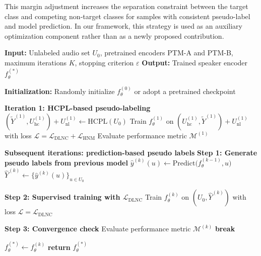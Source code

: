 \documentclass[lettersize,journal]{IEEEtran}
\begin{document}
This margin adjustment increases the separation constraint between
the target class and competing non-target classes for samples with
consistent pseudo-label and model prediction. In our framework, this
strategy is used as an auxiliary optimization component rather than
as a newly proposed contribution.

\begin{algorithm}[t]
\caption{Iterative Unsupervised Speaker Verification Training with HCPL Initialization}
\label{alg:alg2}
\begin{algorithmic}
\STATE 
\STATE \textbf{Input:} Unlabeled audio set $U_{0}$, pretrained encoders PTM-A and PTM-B, maximum iterations $K$, stopping criterion $\varepsilon$
\STATE \textbf{Output:} Trained speaker encoder $f_{\theta}^{(*)}$

\STATE 
\STATE \textbf{Initialization:} Randomly initialize $f_{\theta}^{(0)}$ or adopt a pretrained checkpoint

\STATE 
\STATE \textbf{Iteration 1: HCPL-based pseudo-labeling}
\STATE $(\tilde{Y}^{(1)}, U_{\mathrm{hc}}^{(1)})+U_{\mathrm{nl}}^{(1)} \gets \mathrm{HCPL}(U_{0})$ \hfill {}
\STATE Train $f_{\theta}^{(1)}$ on $(U_{\mathrm{hc}}^{(1)}, \tilde{Y}^{(1)}) + U_{\mathrm{nl}}^{(1)}$ with loss
\STATE \hspace{0.8cm} $\mathcal{L} = \mathcal{L}_{\mathrm{DLNC}} + \mathcal{L}_{\mathrm{HNM}}$
\STATE Evaluate performance metric $\mathcal{M}^{(1)}$

\STATE 
\STATE \textbf{Subsequent iterations: prediction-based pseudo labels}
    \STATE \textbf{Step 1: Generate pseudo labels from previous model}
        \STATE $\hat{y}^{(k)}(u) \gets \mathrm{Predict}\big(f_{\theta}^{(k-1)}, u\big)$
    \ENDFOR
    \STATE $\hat{Y}^{(k)} \gets \{\hat{y}^{(k)}(u)\}_{u \in U_{0}}$
    
    \STATE 
    \STATE \textbf{Step 2: Supervised training with $\mathcal{L}_{\mathrm{DLNC}}$}
    \STATE Train $f_{\theta}^{(k)}$ on $(U_{0}, \hat{Y}^{(k)})$ with loss
    \STATE \hspace{0.8cm} $\mathcal{L} = \mathcal{L}_{\mathrm{DLNC}}$
    
    \STATE 
    \STATE \textbf{Step 3: Convergence check}
    \STATE Evaluate performance metric $\mathcal{M}^{(k)}$
        \STATE \textbf{break}
    \ENDIF
\ENDFOR

\STATE 
\STATE $f_{\theta}^{(*)} \gets f_{\theta}^{(k)}$
\STATE \textbf{return} $f_{\theta}^{(*)}$

\end{algorithmic}
\end{algorithm}
\end{document}
